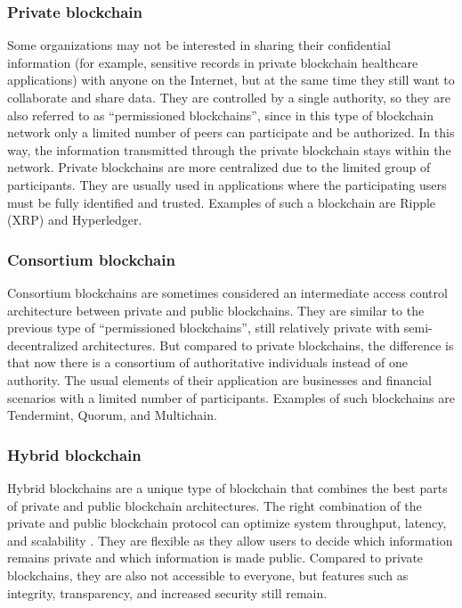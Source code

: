 \subsubsection{Private blockchain}

Some organizations may not be interested in sharing their confidential information (for example, sensitive records in private blockchain healthcare applications\cite{blockchainInHealthcare}) with anyone on the Internet, but at the same time they still want to collaborate and share data. They are controlled by a single authority, so they are also referred to as ``permissioned blockchains'', since in this type of blockchain network only a limited number of peers can participate and be authorized. In this way, the information transmitted through the private blockchain stays within the network. Private blockchains are more centralized due to the limited group of participants. They are usually used in applications where the participating users must be fully identified and trusted. Examples of such a blockchain are Ripple (XRP) and Hyperledger\cite{ConsensusInTheWild}.

\subsubsection{Consortium blockchain}

Consortium blockchains are sometimes considered an intermediate access control architecture between private and public blockchains. They are similar to the previous type of ``permissioned blockchains'', still relatively private with semi-decentralized architectures. But compared to private blockchains, the difference is that now there is a consortium of authoritative individuals instead of one authority. The usual elements of their application are businesses and financial scenarios with a limited number of participants. Examples of such blockchains are Tendermint, Quorum, and Multichain\cite{ConsensusInTheWild}.

\subsubsection{Hybrid blockchain}

Hybrid blockchains are a unique type of blockchain that combines the best parts of private and public blockchain architectures. The right combination of the private and public blockchain protocol can optimize system throughput, latency, and scalability \cite{HybridPoSPBFT}.
They are flexible as they allow users to decide which information remains private and which information is made public. Compared to private blockchains, they are also not accessible to everyone, but features such as integrity, transparency, and increased security still remain.


